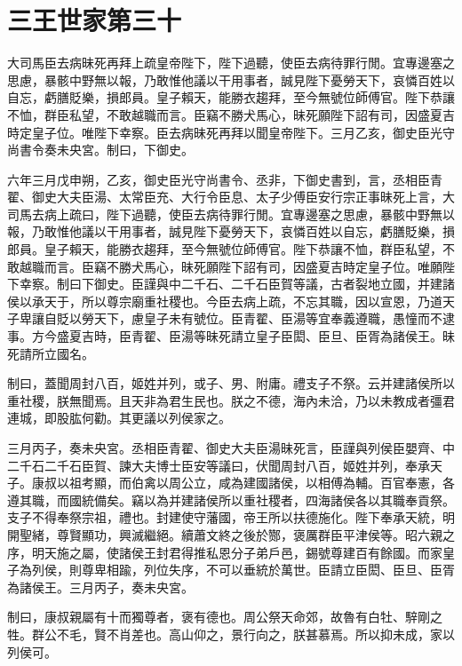 \chapter{三王世家第三十}

大司馬臣去病昧死再拜上疏皇帝陛下，陛下過聽，使臣去病待罪行閒。宜專邊塞之思慮，暴骸中野無以報，乃敢惟他議以干用事者，誠見陛下憂勞天下，哀憐百姓以自忘，虧膳貶樂，損郎員。皇子賴天，能勝衣趨拜，至今無號位師傅官。陛下恭讓不恤，群臣私望，不敢越職而言。臣竊不勝犬馬心，昧死願陛下詔有司，因盛夏吉時定皇子位。唯陛下幸察。臣去病昧死再拜以聞皇帝陛下。三月乙亥，御史臣光守尚書令奏未央宮。制曰，下御史。

六年三月戊申朔，乙亥，御史臣光守尚書令、丞非，下御史書到，言，丞相臣青翟、御史大夫臣湯、太常臣充、大行令臣息、太子少傅臣安行宗正事昧死上言，大司馬去病上疏曰，陛下過聽，使臣去病待罪行閒。宜專邊塞之思慮，暴骸中野無以報，乃敢惟他議以干用事者，誠見陛下憂勞天下，哀憐百姓以自忘，虧膳貶樂，損郎員。皇子賴天，能勝衣趨拜，至今無號位師傅官。陛下恭讓不恤，群臣私望，不敢越職而言。臣竊不勝犬馬心，昧死願陛下詔有司，因盛夏吉時定皇子位。唯願陛下幸察。制曰下御史。臣謹與中二千石、二千石臣賀等議，古者裂地立國，并建諸侯以承天于，所以尊宗廟重社稷也。今臣去病上疏，不忘其職，因以宣恩，乃道天子卑讓自貶以勞天下，慮皇子未有號位。臣青翟、臣湯等宜奉義遵職，愚憧而不逮事。方今盛夏吉時，臣青翟、臣湯等昧死請立皇子臣閎、臣旦、臣胥為諸侯王。昧死請所立國名。

制曰，蓋聞周封八百，姬姓并列，或子、男、附庸。禮支子不祭。云并建諸侯所以重社稷，朕無聞焉。且天非為君生民也。朕之不德，海內未洽，乃以未教成者彊君連城，即股肱何勸。其更議以列侯家之。

三月丙子，奏未央宮。丞相臣青翟、御史大夫臣湯昧死言，臣謹與列侯臣嬰齊、中二千石二千石臣賀、諫大夫博士臣安等議曰，伏聞周封八百，姬姓并列，奉承天子。康叔以祖考顯，而伯禽以周公立，咸為建國諸侯，以相傅為輔。百官奉憲，各遵其職，而國統備矣。竊以為并建諸侯所以重社稷者，四海諸侯各以其職奉貢祭。支子不得奉祭宗祖，禮也。封建使守藩國，帝王所以扶德施化。陛下奉承天統，明開聖緒，尊賢顯功，興滅繼絕。續蕭文終之後於酂，褒厲群臣平津侯等。昭六親之序，明天施之屬，使諸侯王封君得推私恩分子弟戶邑，錫號尊建百有餘國。而家皇子為列侯，則尊卑相踰，列位失序，不可以垂統於萬世。臣請立臣閎、臣旦、臣胥為諸侯王。三月丙子，奏未央宮。

制曰，康叔親屬有十而獨尊者，褒有德也。周公祭天命郊，故魯有白牡、騂剛之牲。群公不毛，賢不肖差也。高山仰之，景行向之，朕甚慕焉。所以抑未成，家以列侯可。

